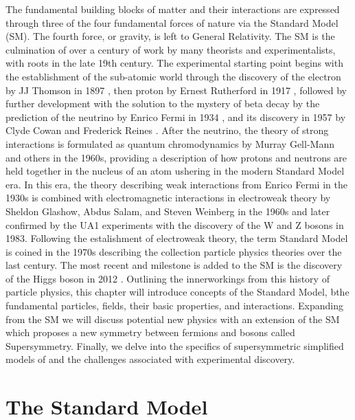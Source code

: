 The fundamental building blocks of matter and their interactions are expressed through three of the four fundamental forces of nature via the Standard Model (SM). The fourth force, or gravity, is left to General Relativity. The SM  is the culmination of over a century of work by many theorists and experimentalists, with roots in the late 19th century. The experimental starting point begins with the establishment of the sub-atomic world through the discovery of the electron by JJ Thomson in 1897 \cite{Thomson:1897cm}, then proton by Ernest Rutherford in 1917 \cite{Rutherford:1911zz}, followed by further development with the solution to the mystery of beta decay by the prediction of the neutrino by Enrico Fermi in 1934 \cite{Fermi:1934hr}, and its discovery in 1957 by Clyde Cowan and Frederick Reines \cite{Reines:1956rs}.  After the neutrino,  the theory of strong interactions is formulated as quantum chromodynamics by Murray Gell-Mann and others in the 1960s, providing a description of how protons and neutrons are held together in the nucleus of an atom \cite{GellMann:1964nj} ushering in the modern Standard Model era. In this era, the theory describing weak interactions from Enrico Fermi in the 1930s is combined with electromagnetic interactions in electroweak theory by Sheldon Glashow, Abdus Salam, and Steven Weinberg in the 1960s \cite{GLASHOW1961579}\cite{Salam:1968rm}\cite{Weinberg:1967tq} and later confirmed by the UA1 experiments with the discovery of the W and Z bosons in 1983\cite{arnison1983experimental}\cite{glashow1984future}. Following the estalishment of electroweak theory, the term Standard Model is coined in the 1970s describing the collection particle physics theories over the last century. The most recent and milestone is added to the SM is the discovery of the Higgs boson in 2012 \cite{hCMS:2012qbp}\cite{ATLAS:2012yve}.  Outlining the innerworkings from this history of particle physics, this chapter will introduce concepts of the Standard Model, bthe fundamental particles, fields, their basic properties, and interactions. Expanding from the  SM we will discuss potential new physics with an extension of the SM which proposes a new symmetry between fermions and bosons called Supersymmetry. Finally, we delve into the specifics of supersymmetric simplified models of and the challenges associated with experimental discovery.



\section{The Standard Model}

